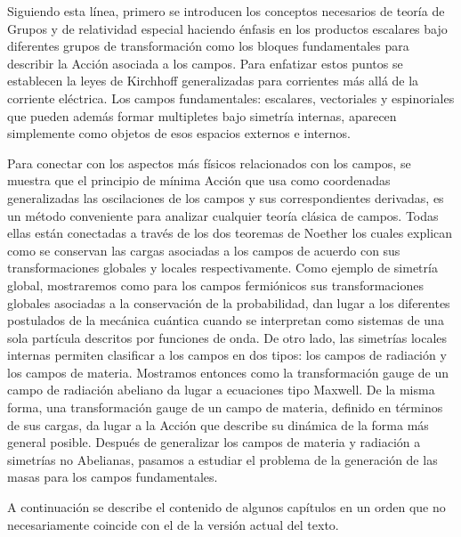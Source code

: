 Siguiendo esta línea, primero se introducen los conceptos necesarios de teoría de Grupos y de relatividad especial haciendo énfasis en los productos escalares bajo diferentes grupos de transformación como los bloques fundamentales para describir la Acción asociada a los campos. Para enfatizar estos puntos se establecen la leyes de Kirchhoff generalizadas para corrientes más allá de la corriente eléctrica. Los campos fundamentales: escalares, vectoriales y espinoriales que pueden además formar multipletes bajo simetría internas, aparecen simplemente como objetos de esos espacios externos e internos.

Para conectar con los aspectos más físicos relacionados con los campos, se muestra que el principio de mínima Acción que usa como coordenadas generalizadas las oscilaciones de los campos y sus correspondientes derivadas, es un método conveniente para analizar cualquier teoría clásica de campos. Todas ellas están conectadas a través de los dos teoremas de Noether los cuales explican como se conservan las cargas asociadas a los campos de acuerdo con sus transformaciones globales y locales respectivamente.
%
Como ejemplo de simetría global, mostraremos como para los campos
fermiónicos sus transformaciones globales asociadas a la conservación
de la probabilidad, dan lugar a los diferentes postulados de la
mecánica cuántica cuando se interpretan como sistemas de una sola
partícula descritos por funciones de onda.
%
De otro lado, las simetrías locales internas permiten clasificar a los campos en dos tipos: los campos de radiación y los campos de materia. Mostramos entonces como la transformación gauge de un campo de radiación abeliano da lugar a ecuaciones tipo Maxwell.  De la misma forma, una transformación gauge de un campo de materia, definido en términos de sus cargas, da lugar a la Acción que describe su dinámica de la forma más general posible. Después de generalizar los campos de materia y radiación a simetrías no Abelianas, pasamos a estudiar el problema de la generación de las masas para los campos fundamentales. 

A continuación se describe el contenido de algunos capítulos en un orden que no necesariamente coincide con el de la versión actual del texto.

